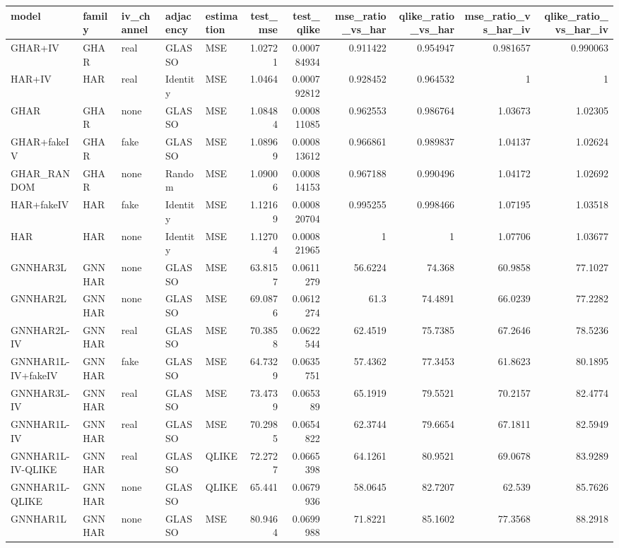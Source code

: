 \begin{tabular}{lllllrrrrrr}
\toprule
model & family & iv_channel & adjacency & estimation & test_mse & test_qlike & mse_ratio_vs_har & qlike_ratio_vs_har & mse_ratio_vs_har_iv & qlike_ratio_vs_har_iv \\
\midrule
GHAR+IV & GHAR & real & GLASSO & MSE & 1.02721 & 0.000784934 & 0.911422 & 0.954947 & 0.981657 & 0.990063 \\
HAR+IV & HAR & real & Identity & MSE & 1.0464 & 0.000792812 & 0.928452 & 0.964532 & 1 & 1 \\
GHAR & GHAR & none & GLASSO & MSE & 1.08484 & 0.000811085 & 0.962553 & 0.986764 & 1.03673 & 1.02305 \\
GHAR+fakeIV & GHAR & fake & GLASSO & MSE & 1.08969 & 0.000813612 & 0.966861 & 0.989837 & 1.04137 & 1.02624 \\
GHAR_RANDOM & GHAR & none & Random & MSE & 1.09006 & 0.000814153 & 0.967188 & 0.990496 & 1.04172 & 1.02692 \\
HAR+fakeIV & HAR & fake & Identity & MSE & 1.12169 & 0.000820704 & 0.995255 & 0.998466 & 1.07195 & 1.03518 \\
HAR & HAR & none & Identity & MSE & 1.12704 & 0.000821965 & 1 & 1 & 1.07706 & 1.03677 \\
GNNHAR3L & GNNHAR & none & GLASSO & MSE & 63.8157 & 0.0611279 & 56.6224 & 74.368 & 60.9858 & 77.1027 \\
GNNHAR2L & GNNHAR & none & GLASSO & MSE & 69.0876 & 0.0612274 & 61.3 & 74.4891 & 66.0239 & 77.2282 \\
GNNHAR2L-IV & GNNHAR & real & GLASSO & MSE & 70.3858 & 0.0622544 & 62.4519 & 75.7385 & 67.2646 & 78.5236 \\
GNNHAR1L-IV+fakeIV & GNNHAR & fake & GLASSO & MSE & 64.7329 & 0.0635751 & 57.4362 & 77.3453 & 61.8623 & 80.1895 \\
GNNHAR3L-IV & GNNHAR & real & GLASSO & MSE & 73.4739 & 0.065389 & 65.1919 & 79.5521 & 70.2157 & 82.4774 \\
GNNHAR1L-IV & GNNHAR & real & GLASSO & MSE & 70.2985 & 0.0654822 & 62.3744 & 79.6654 & 67.1811 & 82.5949 \\
GNNHAR1L-IV-QLIKE & GNNHAR & real & GLASSO & QLIKE & 72.2727 & 0.0665398 & 64.1261 & 80.9521 & 69.0678 & 83.9289 \\
GNNHAR1L-QLIKE & GNNHAR & none & GLASSO & QLIKE & 65.441 & 0.0679936 & 58.0645 & 82.7207 & 62.539 & 85.7626 \\
GNNHAR1L & GNNHAR & none & GLASSO & MSE & 80.9464 & 0.0699988 & 71.8221 & 85.1602 & 77.3568 & 88.2918 \\
\bottomrule
\end{tabular}
